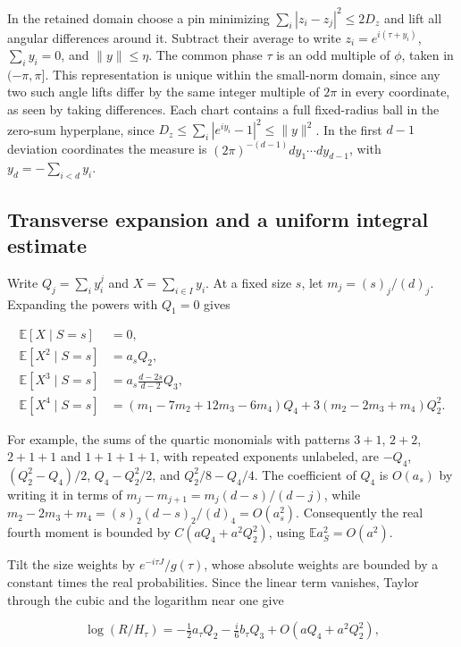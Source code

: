 In the retained domain choose a pin minimizing $\sum_i|z_i-z_j|^2\le2D_z$ and lift all angular differences around it. Subtract their average to write $z_i=e^{i(\tau+y_i)}$, $\sum_i y_i=0$, and $\|y\|\le\eta$. The common phase $\tau$ is an odd multiple of $\phi$, taken in $(-\pi,\pi]$. This representation is unique within the small-norm domain, since any two such angle lifts differ by the same integer multiple of $2\pi$ in every coordinate, as seen by taking differences. Each chart contains a full fixed-radius ball in the zero-sum hyperplane, since $D_z\le\sum_i|e^{iy_i}-1|^2\le\|y\|^2$. In the first $d-1$ deviation coordinates the measure is $(2\pi)^{-(d-1)}dy_1\cdots dy_{d-1}$, with $y_d=-\sum_{i<d}y_i$.

\subsection{Transverse expansion and a uniform integral estimate}

Write $Q_j=\sum_i y_i^j$ and $X=\sum_{i\in I}y_i$. At a fixed size $s$, let $m_j=(s)_j/(d)_j$. Expanding the powers with $Q_1=0$ gives

\begin{equation*}
\begin{aligned}
\mathbb E[X\mid S=s]&=0,\\
\mathbb E[X^2\mid S=s]&=a_sQ_2,\\
\mathbb E[X^3\mid S=s]&=a_s\frac{d-2s}{d-2}Q_3,\\
\mathbb E[X^4\mid S=s]&=(m_1-7m_2+12m_3-6m_4)Q_4
       +3(m_2-2m_3+m_4)Q_2^2.
\end{aligned}
\end{equation*}

For example, the sums of the quartic monomials with patterns $3+1$, $2+2$, $2+1+1$ and $1+1+1+1$, with repeated exponents unlabeled, are $-Q_4$, $(Q_2^2-Q_4)/2$, $Q_4-Q_2^2/2$, and $Q_2^2/8-Q_4/4$. The coefficient of $Q_4$ is $O(a_s)$ by writing it in terms of $m_j-m_{j+1}=m_j(d-s)/(d-j)$, while $m_2-2m_3+m_4=(s)_2(d-s)_2/(d)_4=O(a_s^2)$. Consequently the real fourth moment is bounded by $C(a Q_4+a^2Q_2^2)$, using $\mathbb E a_S^2=O(a^2)$.

Tilt the size weights by $e^{-i\tau J}/g(\tau)$, whose absolute weights are bounded by a constant times the real probabilities. Since the linear term vanishes, Taylor through the cubic and the logarithm near one give

\begin{equation}
\log(R/H_\tau)
=-\tfrac12 a_\tau Q_2-\tfrac{i}{6}b_\tau Q_3
       +O(a Q_4+a^2Q_2^2),
\tag{S3}
\end{equation}

